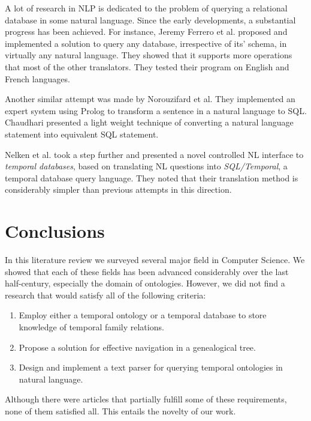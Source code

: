 A lot of research in NLP is dedicated to the problem of querying a relational database in some natural language. Since the early
developments, a substantial progress has been achieved. For instance, Jeremy Ferrero et al. proposed and implemented \cite{fr2sql}
a solution to query any database, irrespective of its' schema, in virtually any natural language. They showed that it supports
more operations that most of the other translators. They tested their program on English and French languages.

Another similar attempt was made \cite{not} by Norouzifard et al. They implemented an expert system using Prolog to transform a
sentence in a natural language to SQL. Chaudhari \cite{chaudhari} presented a light weight technique of converting a natural
language statement into equivalent SQL
statement.

Nelken et al. took \cite{nelken} a step further and presented a novel controlled NL interface to \textit{temporal databases}, based on
translating NL questions into \textit{SQL/Temporal}, a temporal database query language. They noted that their translation method
is considerably simpler than previous attempts in this direction.

\section{Conclusions}
In this literature review we surveyed several major field in Computer Science. We showed that each of these fields has been advanced
considerably over the last half-century, especially the domain of ontologies. However, we did not find a research that would
satisfy all of the following criteria:
\begin{enumerate}
    \item{Employ either a temporal ontology or a temporal database to store knowledge of temporal family relations.}
    \item{Propose a solution for effective navigation in a genealogical tree.}
    \item{Design and implement a text parser for querying temporal ontologies in natural language.}
\end{enumerate}
Although there were articles that partially fulfill some of these requirements, none of them satisfied all.
This entails the novelty of our work.
